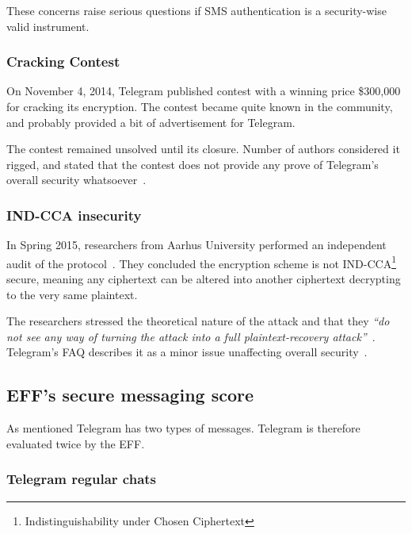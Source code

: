 \documentclass[thesis=M,english]{FITthesis}[2012/10/20]
\begin{document}
These concerns raise serious questions if SMS authentication is a security-wise valid instrument.

\subsubsection{Cracking Contest}

On November 4, 2014, Telegram published contest with a winning price \$300,000 for cracking its encryption. The contest became quite known in the community, and probably provided a bit of advertisement for Telegram.

The contest remained unsolved until its closure. Number of authors considered it rigged, and stated that the contest does not provide any prove of Telegram's overall security whatsoever~\cite{telegramcontestfail,telegramcontestfail2}.

\subsubsection{IND-CCA insecurity}

In Spring 2015, researchers from Aarhus University performed an independent audit of the protocol~\cite{telegram-aarhus}. They concluded the encryption scheme is not IND-CCA\footnote{Indistinguishability under Chosen Ciphertext} secure, meaning any ciphertext can be altered into another ciphertext decrypting to the very same plaintext.

The researchers stressed the theoretical nature of the attack and that they \emph{``do not see any way of turning the attack into a full plaintext-recovery attack''}~\cite{telegram-aarhus}. Telegram's FAQ describes it as a minor issue unaffecting overall security~\cite{telegram-techfaq}.


\subsection{EFF's secure messaging score}

As mentioned Telegram has two types of messages. Telegram is therefore evaluated twice by the EFF.


\subsubsection{Telegram regular chats}
\end{document}
